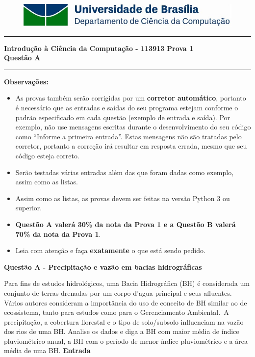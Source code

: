 \documentclass[a4paper, 12pt]{article}
\begin{document}
\begin{figure}[H]
	\includegraphics[scale=0.9]{UnB_CiC_Logo.jpg}
\end{figure}
\noindent\rule{\textwidth}{0.4pt}
\begin{center}
	\textbf{{\Large Introdução à Ciência da Computação - 113913}} \newline \newline
	\textbf{{\large Prova 1} \\
	\vspace{9pt}
	{\large Questão A}} \\
	\noindent\rule{\textwidth}{0.4pt}
	\newline
\end{center}

\textbf{{\large Observações:}}
\begin{itemize}
	\item As provas também serão corrigidas por um \textbf{corretor automático}, portanto é necessário que as entradas e saídas do seu programa estejam conforme o padrão especificado em cada questão (exemplo de entrada e saída). Por exemplo, não use mensagens escritas durante o desenvolvimento do seu código como “Informe a primeira entrada”. Estas mensagens não são tratadas pelo corretor, portanto a correção irá resultar em resposta errada, mesmo que seu código esteja correto.
	\item Serão testadas várias entradas além das que foram dadas como exemplo, assim como as listas.
	\item Assim como as listas, as provas devem ser feitas na versão Python 3 ou superior.
	\item \textbf{Questão A valerá 30\% da nota da Prova 1 e a Questão B valerá 70\% da nota da Prova 1}.
	\item Leia com atenção e faça \textbf{exatamente} o que está sendo pedido.
\end{itemize}
\newpage %
\begin{center}
\textbf{{\Large Questão A - Precipitação e vazão em bacias hidrográficas}}
\end{center}
\vspace{5pt}

Para fins de estudos hidrológicos, uma Bacia Hidrográfica (BH) é considerada um conjunto de terras drenadas por um corpo d’agua principal e seus afluentes. Vários autores consideram a importância do uso de conceito de BH similar ao de ecossistema, tanto para estudos como para o Gerenciamento Ambiental. A precipitação, a cobertura florestal e o tipo de solo/subsolo influenciam na vazão dos rios de uma BH. Analise os dados e diga a BH com maior média de índice pluviométrico anual, a BH com o período de menor índice pluviométrico e a área média de uma BH. 
\newline \newline
\textbf{{\large Entrada}} \newline
\end{document}
